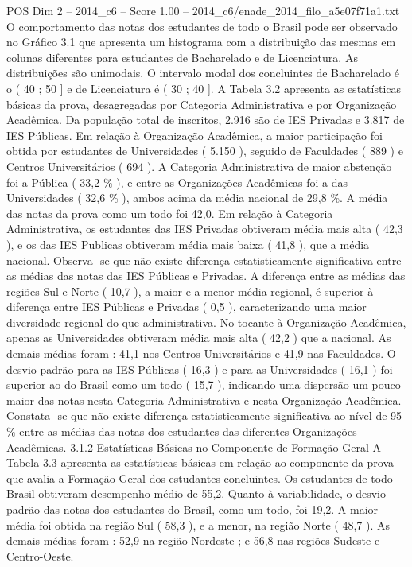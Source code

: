 \begin{textsample}{POS Dim 2 – 2014\_c6 – Score 1.00 – 2014\_c6/enade\_2014\_filo\_a5e07f71a1.txt}
O comportamento das notas dos estudantes de todo o Brasil pode ser observado no Gráfico 3.1 que apresenta um histograma com a distribuição das mesmas em colunas diferentes para estudantes de Bacharelado e de Licenciatura.
As distribuições são unimodais.
O intervalo modal dos concluintes de Bacharelado é o ( 40 ; 50 ] e de Licenciatura é ( 30 ; 40 ].
A Tabela 3.2 apresenta as estatísticas básicas da prova, desagregadas por Categoria Administrativa e por Organização Acadêmica.
Da população total de inscritos, 2.916 são de IES Privadas e 3.817 de IES Públicas.
Em relação à Organização Acadêmica, a maior participação foi obtida por estudantes de Universidades ( 5.150 ), seguido de Faculdades ( 889 ) e Centros Universitários ( 694 ).
A Categoria Administrativa de maior abstenção foi a Pública ( 33,2 \% ), e entre as Organizações Acadêmicas foi a das Universidades ( 32,6 \% ), ambos acima da média nacional de 29,8 \%.
A média das notas da prova como um todo foi 42,0.
Em relação à Categoria Administrativa, os estudantes das IES Privadas obtiveram média mais alta ( 42,3 ), e os das IES Publicas obtiveram média mais baixa ( 41,8 ), que a média nacional.
Observa -se que não existe diferença estatisticamente significativa entre as médias das notas das IES Públicas e Privadas.
A diferença entre as médias das regiões Sul e Norte ( 10,7 ), a maior e a menor média regional, é superior à diferença entre IES Públicas e Privadas ( 0,5 ), caracterizando uma maior diversidade regional do que administrativa.
No tocante à Organização Acadêmica, apenas as Universidades obtiveram média mais alta ( 42,2 ) que a nacional.
As demais médias foram : 41,1 nos Centros Universitários e 41,9 nas Faculdades.
O desvio padrão para as IES Públicas ( 16,3 ) e para as Universidades ( 16,1 ) foi superior ao do Brasil como um todo ( 15,7 ), indicando uma dispersão um pouco maior das notas nesta Categoria Administrativa e nesta Organização Acadêmica.
Constata -se que não existe diferença estatisticamente significativa ao nível de 95 \% entre as médias das notas dos estudantes das diferentes Organizações Acadêmicas. 3.1.2 Estatísticas Básicas no Componente de Formação Geral A Tabela 3.3 apresenta as estatísticas básicas em relação ao componente da prova que avalia a Formação Geral dos estudantes concluintes.
Os estudantes de todo Brasil obtiveram desempenho médio de 55,2.
Quanto à variabilidade, o desvio padrão das notas dos estudantes do Brasil, como um todo, foi 19,2.
A maior média foi obtida na região Sul ( 58,3 ), e a menor, na região Norte ( 48,7 ).
As demais médias foram : 52,9 na região Nordeste ; e 56,8 nas regiões Sudeste e Centro-Oeste.

\end{textsample}
